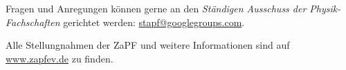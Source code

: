 \documentclass{scrartcl}
\begin{document}
\vspace{0.5cm}
Fragen und Anregungen k\"onnen gerne an den \emph{St\"andigen Ausschuss der Physik-Fachschaften} gerichtet werden:
\href{mailto:stapf@googlegroups.com}{\url{stapf@googlegroups.com}}. 

Alle Stellungnahmen der ZaPF und weitere Informationen sind auf \href{http://www.zapfev.de}{\url{www.zapfev.de}} zu finden.
\end{document}
